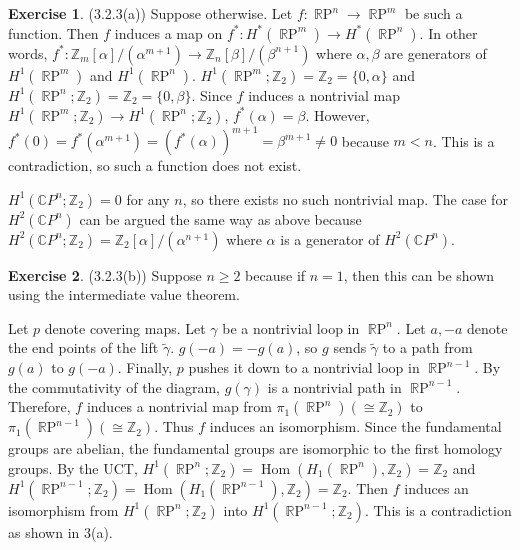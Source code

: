 \documentclass[12pt, psamsfonts]{amsart}
\theoremstyle{definition}
\newtheorem*{exer}{Exercise}
\theoremstyle{remark}
\DeclareMathOperator{\Hom}{Hom}
\DeclareMathOperator{\RP}{\mathbb{R}P}
\numberwithin{equation}{section}
\begin{document}
\begin{exer}{(3.2.3(a))}
  Suppose otherwise.
  Let $f: \RP^n \rightarrow \RP^m$ be such a function.
  Then $f$ induces a map on $f^{\ast}: H^{\ast}(\RP^m) \rightarrow H^{\ast}(\RP^n)$.
  In other words, $f^{\ast}: \mathbb{Z}_m[\alpha]/(\alpha^{m + 1}) \rightarrow \mathbb{Z}_n[\beta]/(\beta^{n + 1})$ where $\alpha, \beta$ are generators of $H^1(\RP^m)$ and $H^1(\RP^n)$.
  $H^1(\RP^m; \mathbb{Z}_2) = \mathbb{Z}_2 = \{ 0, \alpha \}$ and $H^1(\RP^n; \mathbb{Z}_2) = \mathbb{Z}_2 = \{ 0, \beta \}$.
  Since $f$ induces a nontrivial map $H^1(\RP^m; \mathbb{Z}_2) \rightarrow H^1(\RP^n; \mathbb{Z}_2)$, $f^{\ast}(\alpha) = \beta$.
  However, $f^{\ast}(0) = f^{\ast}(\alpha^{m + 1}) = (f^{\ast}(\alpha))^{m + 1} = \beta^{m + 1} \ne 0$ because $m < n$.
  This is a contradiction, so such a function does not exist.

  $H^1(\mathbb{C}P^n; \mathbb{Z}_2) = 0$ for any $n$, so there exists no such nontrivial map.
  The case for $H^2(\mathbb{C}P^n)$ can be argued the same way as above because $H^2(\mathbb{C}P^n;\mathbb{Z}_2) = \mathbb{Z}_2[\alpha]/(\alpha^{n + 1})$ where $\alpha$ is a generator of $H^2(\mathbb{C}P^n)$.
\end{exer}

\begin{exer}{(3.2.3(b))}
  Suppose $n \geq 2$ because if $n = 1$, then this can be shown using the intermediate value theorem.
  \begin{center}
  \end{center}

  Let $p$ denote covering maps.
  Let $\gamma$ be a nontrivial loop in $\RP^n$.
  Let $a, -a$ denote the end points of the lift $\tilde{\gamma}$.
  $g(-a) = -g(a)$, so $g$ sends $\tilde{\gamma}$ to a path from $g(a)$ to $g(-a)$.
  Finally, $p$ pushes it down to a nontrivial loop in $\RP^{n - 1}$.
  By the commutativity of the diagram, $g(\gamma)$ is a nontrivial path in $\RP^{n - 1}$.
  Therefore, $f$ induces a nontrivial map from $\pi_1(\RP^n) (\cong \mathbb{Z}_2)$ to $\pi_1(\RP^{n - 1}) (\cong \mathbb{Z}_2)$.
  Thus $f$ induces an isomorphism.
  Since the fundamental groups are abelian, the fundamental groups are isomorphic to the first homology groups.
  By the UCT, $H^1(\RP^n; \mathbb{Z}_2) = \Hom(H_1(\RP^n), \mathbb{Z}_2) = \mathbb{Z}_2$ and $H^1(\RP^{n - 1}; \mathbb{Z}_2) = \Hom(H_1(\RP^{n - 1}), \mathbb{Z}_2) = \mathbb{Z}_2$.
  Then $f$ induces an isomorphism from $H^1(\RP^n; \mathbb{Z}_2)$ into $H^1(\RP^{n - 1}; \mathbb{Z}_2)$.
  This is a contradiction as shown in 3(a).
\end{exer}
\end{document}
